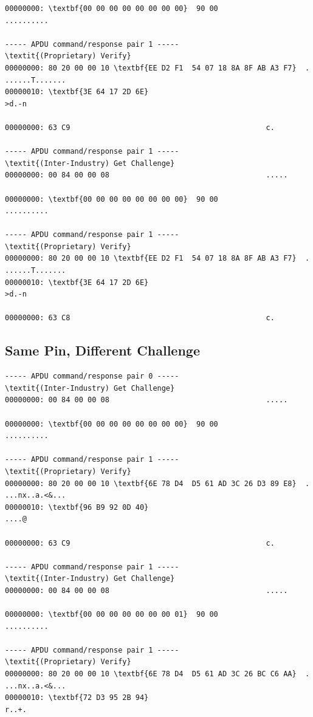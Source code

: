 \documentclass[bsc,frontabs,twoside,singlespacing,parskip,deptreport]{infthesis}     %
\begin{document}
\begin{appendices}
\begin{Verbatim}[commandchars=\\\{\}, fontsize=\small]
00000000: \textbf{00 00 00 00 00 00 00 00}  90 00                    ..........

----- APDU command/response pair 1 -----
\textit{(Proprietary) Verify}
00000000: 80 20 00 00 10 \textbf{EE D2 F1  54 07 18 8A 8F AB A3 F7}  . ......T.......
00000010: \textbf{3E 64 17 2D 6E}                                    >d.-n

00000000: 63 C9                                             c.

----- APDU command/response pair 1 -----
\textit{(Inter-Industry) Get Challenge}
00000000: 00 84 00 00 08                                    .....

00000000: \textbf{00 00 00 00 00 00 00 00}  90 00                    ..........

----- APDU command/response pair 1 -----
\textit{(Proprietary) Verify}
00000000: 80 20 00 00 10 \textbf{EE D2 F1  54 07 18 8A 8F AB A3 F7}  . ......T.......
00000010: \textbf{3E 64 17 2D 6E}                                    >d.-n

00000000: 63 C8                                             c.

\end{Verbatim}
\subsection{Same Pin, Different Challenge}
\begin{Verbatim}[commandchars=\\\{\}, fontsize=\small]
----- APDU command/response pair 0 -----
\textit{(Inter-Industry) Get Challenge}
00000000: 00 84 00 00 08                                    .....

00000000: \textbf{00 00 00 00 00 00 00 00}  90 00                    ..........

----- APDU command/response pair 1 -----
\textit{(Proprietary) Verify}
00000000: 80 20 00 00 10 \textbf{6E 78 D4  D5 61 AD 3C 26 D3 89 E8}  . ...nx..a.<&...
00000010: \textbf{96 B9 92 0D 40}                                    ....@

00000000: 63 C9                                             c.

----- APDU command/response pair 1 -----
\textit{(Inter-Industry) Get Challenge}
00000000: 00 84 00 00 08                                    .....

00000000: \textbf{00 00 00 00 00 00 00 01}  90 00                    ..........

----- APDU command/response pair 1 -----
\textit{(Proprietary) Verify}
00000000: 80 20 00 00 10 \textbf{6E 78 D4  D5 61 AD 3C 26 BC C6 AA}  . ...nx..a.<&...
00000010: \textbf{72 D3 95 2B 94}                                    r..+.


\end{Verbatim}
\end{appendices}
\end{document}
